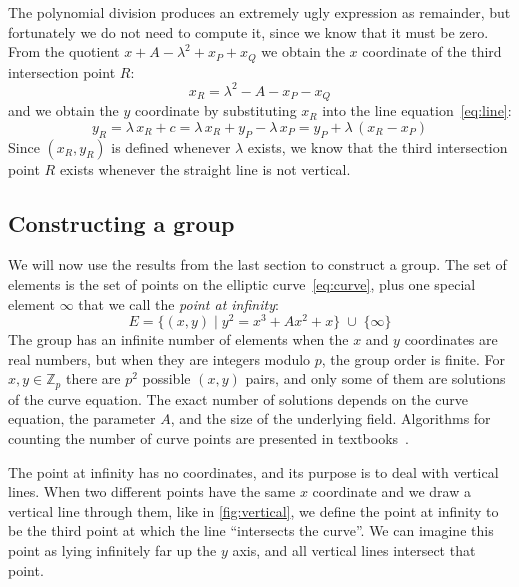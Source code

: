 \documentclass{article}
\begin{document}
The polynomial division produces an extremely ugly expression as remainder, but fortunately we do not need to compute it, since we know that it must be zero.
From the quotient $x + A - \lambda^2 + x_P + x_Q$ we obtain the $x$ coordinate of the third intersection point $R$:
\begin{equation}
x_R = \lambda^2 - A - x_P - x_Q \label{eq:xR}
\end{equation}
and we obtain the $y$ coordinate by substituting $x_R$ into the line equation~\eqref{eq:line}:
\begin{equation}
y_R = \lambda\,x_R + c = \lambda\,x_R + y_P - \lambda\,x_P = y_P + \lambda\,(x_R - x_P) \label{eq:yR}
\end{equation}
Since $(x_R, y_R)$ is defined whenever $\lambda$ exists, we know that the third intersection point $R$ exists whenever the straight line is not vertical.

\subsection{Constructing a group}\label{sec:group-construction}

We will now use the results from the last section to construct a group.
The set of elements is the set of points on the elliptic curve~\eqref{eq:curve}, plus one special element $\infty$ that we call the \emph{point at infinity}:
\begin{equation}
E = \{(x,y) \mid y^2 = x^3 + A x^2 + x\} \;\cup\; \{\infty\}
\end{equation}
The group has an infinite number of elements when the $x$ and $y$ coordinates are real numbers, but when they are integers modulo $p$, the group order is finite.
For $x, y \in \mathbb{Z}_p$ there are $p^2$ possible $(x, y)$ pairs, and only some of them are solutions of the curve equation.
The exact number of solutions depends on the curve equation, the parameter $A$, and the size of the underlying field.
Algorithms for counting the number of curve points are presented in textbooks~\cite{Blake:1999,Cohen:2006}.

The point at infinity has no coordinates, and its purpose is to deal with vertical lines.
When two different points have the same $x$ coordinate and we draw a vertical line through them, like in \autoref{fig:vertical}, we define the point at infinity to be the third point at which the line ``intersects the curve''.
We can imagine this point as lying infinitely far up the $y$ axis, and all vertical lines intersect that point.
\end{document}
